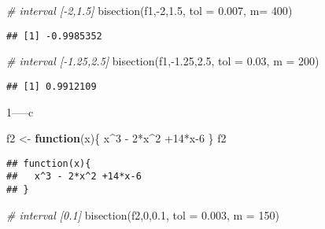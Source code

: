 \documentclass[
]{article}
\newenvironment{Shaded}{\begin{snugshade}}{\end{snugshade}}
\newcommand{\AttributeTok}[1]{\textcolor[rgb]{0.77,0.63,0.00}{#1}}
\newcommand{\CommentTok}[1]{\textcolor[rgb]{0.56,0.35,0.01}{\textit{#1}}}
\newcommand{\ControlFlowTok}[1]{\textcolor[rgb]{0.13,0.29,0.53}{\textbf{#1}}}
\newcommand{\DecValTok}[1]{\textcolor[rgb]{0.00,0.00,0.81}{#1}}
\newcommand{\FloatTok}[1]{\textcolor[rgb]{0.00,0.00,0.81}{#1}}
\newcommand{\FunctionTok}[1]{\textcolor[rgb]{0.00,0.00,0.00}{#1}}
\newcommand{\NormalTok}[1]{#1}
\newcommand{\OtherTok}[1]{\textcolor[rgb]{0.56,0.35,0.01}{#1}}
\newcommand{\SpecialCharTok}[1]{\textcolor[rgb]{0.00,0.00,0.00}{#1}}
\begin{document}
\begin{Shaded}
\begin{Highlighting}[]
\CommentTok{\# interval [{-}2,1.5]}
\FunctionTok{bisection}\NormalTok{(f1,}\SpecialCharTok{{-}}\DecValTok{2}\NormalTok{,}\FloatTok{1.5}\NormalTok{, }\AttributeTok{tol =} \FloatTok{0.007}\NormalTok{, }\AttributeTok{m=} \DecValTok{400}\NormalTok{)}
\end{Highlighting}
\end{Shaded}

\begin{verbatim}
## [1] -0.9985352
\end{verbatim}

\begin{Shaded}
\begin{Highlighting}[]
\CommentTok{\# interval [{-}1.25,2.5]}
\FunctionTok{bisection}\NormalTok{(f1,}\SpecialCharTok{{-}}\FloatTok{1.25}\NormalTok{,}\FloatTok{2.5}\NormalTok{, }\AttributeTok{tol =} \FloatTok{0.03}\NormalTok{, }\AttributeTok{m =} \DecValTok{200}\NormalTok{)}
\end{Highlighting}
\end{Shaded}

\begin{verbatim}
## [1] 0.9912109
\end{verbatim}

1-----c

\begin{Shaded}
\begin{Highlighting}[]
\NormalTok{f2 }\OtherTok{\textless{}{-}} \ControlFlowTok{function}\NormalTok{(x)\{}
\NormalTok{  x}\SpecialCharTok{\^{}}\DecValTok{3} \SpecialCharTok{{-}} \DecValTok{2}\SpecialCharTok{*}\NormalTok{x}\SpecialCharTok{\^{}}\DecValTok{2} \SpecialCharTok{+}\DecValTok{14}\SpecialCharTok{*}\NormalTok{x}\DecValTok{{-}6}
\NormalTok{\}}
\NormalTok{f2}
\end{Highlighting}
\end{Shaded}

\begin{verbatim}
## function(x){
##   x^3 - 2*x^2 +14*x-6
## }
\end{verbatim}

\begin{Shaded}
\begin{Highlighting}[]
\CommentTok{\# interval [0.1]}
\FunctionTok{bisection}\NormalTok{(f2,}\DecValTok{0}\NormalTok{,}\FloatTok{0.1}\NormalTok{, }\AttributeTok{tol =} \FloatTok{0.003}\NormalTok{, }\AttributeTok{m =} \DecValTok{150}\NormalTok{)}
\end{Highlighting}
\end{Shaded}
\end{document}
